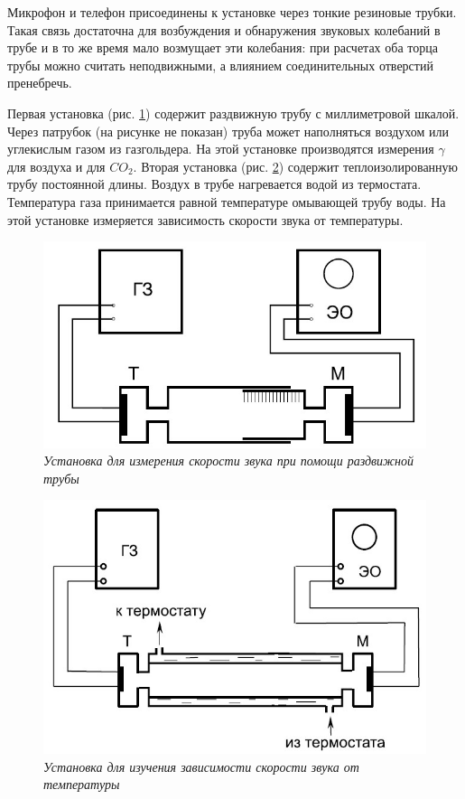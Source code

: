 \documentclass[a4paper,12pt]{article} %
\begin{document}
Микрофон и телефон присоединены к установке через тонкие резиновые трубки. Такая связь достаточна для возбуждения и обнаружения звуковых колебаний в трубе и в то же время мало возмущает эти колебания: при расчетах оба торца трубы можно считать неподвижными, а влиянием соединительных отверстий пренебречь.

Первая установка (рис. \ref{img1}) содержит раздвижную трубу с миллиметровой шкалой. Через патрубок (на рисунке не показан) труба может наполняться воздухом или углекислым газом из газгольдера. На этой установке производятся измерения $ \gamma $ для воздуха и для $ CO_2 $. Вторая установка (рис. \ref{img2}) содержит теплоизолированную трубу постоянной длины. Воздух в трубе нагревается водой из термостата. Температура газа принимается равной температуре омывающей трубу воды. На этой установке измеряется зависимость скорости звука от температуры.

\begin{figure}[H]
	\begin{center}
		\includegraphics[width=12cm]{ust1.jpg}
	\end{center}
	\caption{\textit{Установка для измерения скорости звука при помощи раздвижной трубы}}
	\label{img1}
\end{figure}

\begin{figure}[H]
	\begin{center}
		\includegraphics[width=12cm]{ust2.jpg}
	\end{center}
	\caption{\textit{Установка для изучения зависимости скорости звука от температуры}}
	\label{img2}
\end{figure}
\end{document}
